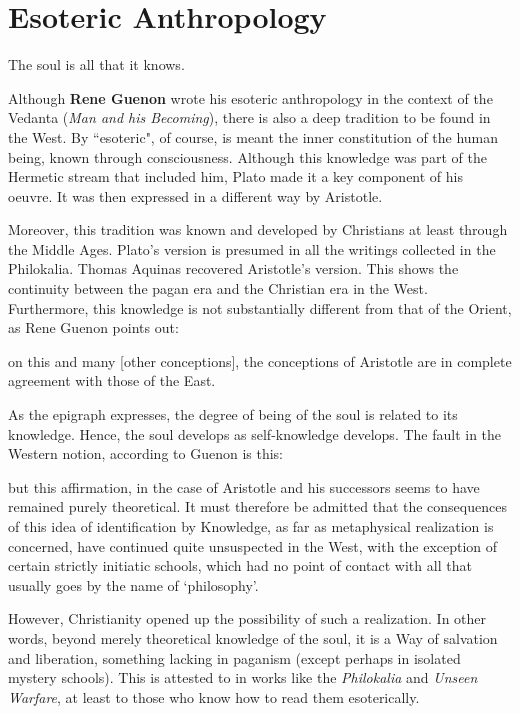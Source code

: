 \section{Esoteric Anthropology}

\begin{quotex}
The soul is all that it knows. 

\end{quotex}
Although \textbf{Rene Guenon} wrote his esoteric anthropology in the context of the Vedanta (\emph{Man and his Becoming}), there is also a deep tradition to be found in the West. By ``esoteric", of course, is meant the inner constitution of the human being, known through consciousness. Although this knowledge was part of the Hermetic stream that included him, Plato made it a key component of his oeuvre. It was then expressed in a different way by Aristotle.

Moreover, this tradition was known and developed by Christians at least through the Middle Ages. Plato's version is presumed in all the writings collected in the Philokalia. Thomas Aquinas recovered Aristotle's version. This shows the continuity between the pagan era and the Christian era in the West. Furthermore, this knowledge is not substantially different from that of the Orient, as Rene Guenon points out:

\begin{quotex}
on this and many [other conceptions], the conceptions of Aristotle are in complete agreement with those of the East. 

\end{quotex}
As the epigraph expresses, the degree of being of the soul is related to its knowledge. Hence, the soul develops as self-knowledge develops. The fault in the Western notion, according to Guenon is this:

\begin{quotex}
but this affirmation, in the case of Aristotle and his successors seems to have remained purely theoretical. It must therefore be admitted that the consequences of this idea of identification by Knowledge, as far as metaphysical realization is concerned, have continued quite unsuspected in the West, with the exception of certain strictly initiatic schools, which had no point of contact with all that usually goes by the name of `philosophy'. 

\end{quotex}
However, Christianity opened up the possibility of such a realization. In other words, beyond merely theoretical knowledge of the soul, it is a Way of salvation and liberation, something lacking in paganism (except perhaps in isolated mystery schools). This is attested to in works like the \emph{Philokalia} and \emph{Unseen Warfare}, at least to those who know how to read them esoterically.

